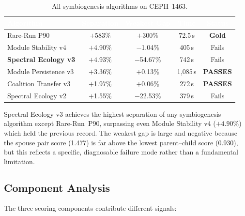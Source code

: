 \documentclass{../yalumba}
\begin{document}
\begin{table}[H]
  \centering
  \tablestyle
  \caption{All symbiogenesis algorithms on CEPH~1463.}
  \label{tab:comparison}
  \begin{tabular}{lcccc}
    \toprule
    \rowcolor{table-header}
    \textcolor{white}{\textbf{Algorithm}} &
    \textcolor{white}{\textbf{Separation}} &
    \textcolor{white}{\textbf{Weakest Gap}} &
    \textcolor{white}{\textbf{Time}} &
    \textcolor{white}{\textbf{Status}} \\
    \midrule
    Rare-Run P90
      & $+$583\% & $+$300\% & 72.5\,s & \textbf{Gold} \\
    Module Stability v4
      & $+$4.90\% & $-$1.04\% & 405\,s & Fails \\
    \textbf{Spectral Ecology v3}
      & $\mathbf{+4.93\%}$ & $-$54.67\% & 742\,s & Fails \\
    Module Persistence v3
      & $+$3.36\% & $+$0.13\% & 1{,}085\,s & \textbf{PASSES} \\
    Coalition Transfer v3
      & $+$1.97\% & $+$0.06\% & 272\,s & \textbf{PASSES} \\
    Spectral Ecology v2
      & $+$1.55\% & $-$22.53\% & 379\,s & Fails \\
    \bottomrule
  \end{tabular}
\end{table}


Spectral Ecology v3 achieves the highest separation of any symbiogenesis
algorithm except Rare-Run~P90, surpassing even Module Stability v4 ($+4.90\%$)
which held the previous record.  The weakest gap is large and negative
because the spouse pair score (1.477) is far above the lowest parent--child
score (0.930), but this reflects a specific, diagnosable failure mode rather
than a fundamental limitation.

\subsection{Component Analysis}

The three scoring components contribute different signals:
\end{document}

